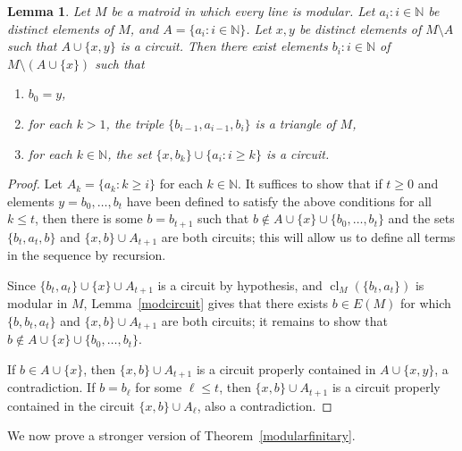 \documentclass{amsart}
\theoremstyle{plain}
\newtheorem{lemma}[theorem]{Lemma}
\theoremstyle{definition}
\newcommand{\bN}{\mathbb N}
\DeclareMathOperator{\cl}{cl}
\newcommand{\del}{\!\setminus\!}
\renewcommand{\le}{\leqslant}
\renewcommand{\ge}{\geqslant}
\begin{document}
\begin{lemma}\label{modularaux}
  Let $M$ be a matroid in which every line is modular. Let $a_i : i \in \bN$ be distinct elements of $M$,
  and $A = \{a_i : i \in \bN\}$. Let $x,y$ be distinct elements of $M \del A$ such that $A \cup \{x,y\}$ is a circuit. 
  Then there exist elements $b_i : i \in \bN$ of $M \del (A \cup \{x\})$ such that
  \begin{enumerate}[(1)]
    \item\label{mab0} $b_0 = y$,
    \item\label{mabt} for each $k > 1$, the triple $\{b_{i-1}, a_{i-1}, b_i\}$ is a triangle of $M$,
    \item\label{mabc} for each $k \in \bN$, the set $\{x, b_k\} \cup \{a_i : i \ge k\}$ is a circuit. 
  \end{enumerate}
\end{lemma}
\begin{proof}
  Let $A_k = \{a_k : k \ge i\}$ for each $k \in \bN$. 
  It suffices to show that if $t \ge 0$ and elements $y = b_0, \dotsc, b_t$ have been defined to satisfy the above conditions 
  for all $k \le t$, 
  then there is some $b = b_{t+1}$ such that 
  $b \notin A \cup \{x\} \cup \{b_0, \dotsc, b_t\}$ and
  the sets $\{b_t, a_t, b\}$ and $\{x, b\} \cup A_{t+1}$ are both circuits; 
  this will allow us to define all terms in the sequence by recursion. 

  Since $\{b_t, a_t\} \cup \{x\} \cup A_{t+1}$ is a circuit by hypothesis, 
  and $\cl_M(\{b_t,a_t\})$ is modular in $M$, Lemma~\ref{modcircuit}
  gives that there exists $b \in E(M)$ for which $\{b,b_t,a_t\}$ and
  $\{x, b\} \cup A_{t+1}$ are both circuits; it remains to show that
  $b \notin A \cup \{x\} \cup \{b_0, \dotsc, b_t\}$. 
  
  If $b \in A \cup \{x\}$, then $\{x,b\} \cup A_{t+1}$ is a circuit properly contained in 
  $A \cup \{x,y\}$, a contradiction. If $b = b_\ell$ for some $\ell \le t$, then 
  $\{x, b\} \cup A_{t+1}$ is a circuit properly contained in the circuit $\{x,b\} \cup A_\ell$, 
  also a contradiction. 
\end{proof}

We now prove a stronger version of Theorem~\ref{modularfinitary}.
\end{document}
